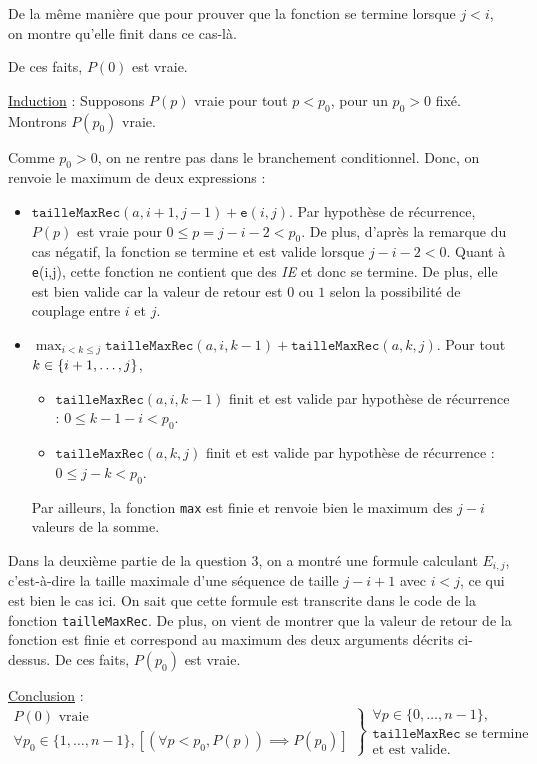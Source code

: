 \documentclass[12pt,a4paper]{article}
\begin{document}
De la m\^eme mani\`ere que pour prouver que la fonction se termine lorsque $j<i$, on montre qu'elle finit dans ce cas-l\`a.

De ces faits, $P(0)$ est vraie.
	
		
	\underline{Induction} : Supposons \( P(p) \) vraie pour tout \( p < p_0 \), pour un $p_0>0$ fix\'e. Montrons \( P(p_0) \) vraie.
	
	Comme $p_0 > 0$, on ne rentre pas dans le branchement conditionnel. Donc, on renvoie le maximum de deux expressions :
	
	\begin{itemize}
		\item $\texttt{tailleMaxRec}(a,i+1,j-1) + \texttt{e}(i,j)$. Par hypoth\`ese de r\'ecurrence, $P(p)$ est vraie pour $0 \leq p=j-i-2 < p_0$. De plus, d'apr\`es la remarque du cas n\'egatif, la fonction se termine et est valide lorsque $j-i-2<0$. Quant \`a \texttt{e}(i,j), cette fonction ne contient que des {\itshape IE} et donc se termine. De plus, elle est bien valide car la valeur de retour est $0$ ou $1$ selon la possibilit\'e de couplage entre $i$ et $j$.
		\item $\displaystyle\max_{i < k \leq j} {\texttt{tailleMaxRec}(a,i,k-1)+\texttt{tailleMaxRec}(a,k,j)}$. Pour tout $\\k \in \{i+1, \dotsc, j\}$, 
		\begin{itemize}
			\item $\texttt{tailleMaxRec}(a,i,k-1)$ finit et est valide par hypoth\`ese de r\'ecurrence : $0 \leq k-1-i < p_0$. 
			\item $\texttt{tailleMaxRec}(a,k,j)$ finit et est valide par hypoth\`ese de r\'ecurrence : $0 \leq j-k < p_0$.
		\end{itemize}
		Par ailleurs, la fonction \texttt{max} est finie et renvoie bien le maximum des $j-i$ valeurs de la somme.
	\end{itemize}
	
	Dans la deuxi\`eme partie de la question 3, on a montr\'e une formule calculant $E_{i,j}$, c'est-\`a-dire la taille maximale d'une s\'equence de taille $j-i+1$ avec $i<j$, ce qui est bien le cas ici. On sait que cette formule est transcrite dans le code de la fonction \texttt{tailleMaxRec}. De plus, on vient de montrer que la valeur de retour de la fonction est finie et correspond au maximum des deux arguments d\'ecrits ci-dessus. De ces faits, $P(p_0)$ est vraie.
	
	
	\underline{Conclusion} : 
	\begin{equation*}
\left .\begin{array}{l}
P(0) \text{ vraie } \\
\forall p_0 \in \{1,\dotsc, n-1\}, [(\forall p < p_0, P(p)) \implies P(p_0) ]
\end{array} \right \}
\left .\begin{array}{l}
\forall p \in \{0,\dotsc, n-1\}, \\
\texttt{tailleMaxRec} \text{ se termine} \\
\text{et est valide.}
\end{array}\right .
\end{equation*}
\end{document}
